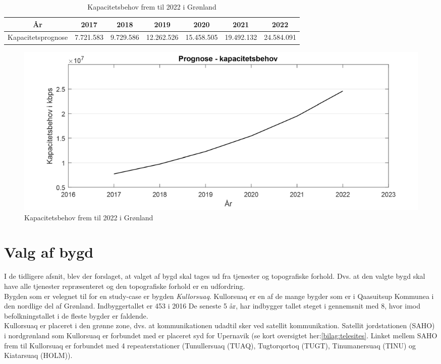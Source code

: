 \begin{table}
	\centering
    \begin{tabular}{|c|c|c|c|c|c|c|}
    \hline
    År                 & 2017      & 2018      & 2019       & 2020       & 2021       & 2022       \\ \hline
    Kapacitetsprognose & 7.721.583 & 9.729.586 & 12.262.526 & 15.458.505 & 19.492.132 & 24.584.091 \\ \hline
    \end{tabular}
    \caption{Kapacitetsbehov frem til 2022 i Grønland}
    \label{tab:kapacitetPrognose}
\end{table}
\begin{figure}
	\centering
	\includegraphics[width=1\textwidth]{figure/kapacitetsbehov.pdf}
	\caption{Kapacitetsbehov frem til 2022 i Grønland}
	\label{fig:kapacitetsbehov}
\end{figure}

\section{Valg af bygd}
I de tidligere afsnit, blev der forslaget, at valget af bygd skal tages ud fra tjenester og topografiske forhold. Dvs. at den valgte bygd skal have alle tjenester repræsenteret og den topografiske forhold er en udfordring.\\
Bygden som er velegnet til for en study-case er bygden \textit{Kullorsuaq}. Kullorsuaq er en af de mange bygder som er i Qaasuitsup Kommunea i den nordlige del af Grønland. Indbyggertallet er 453 i 2016\cite{grlStatBefolkning} De seneste 5 år, har indbygger tallet steget i gennemsnit med 8, hvor imod befolkningstallet i de fleste bygder er faldende.\\
Kullorsuaq er placeret i den grønne zone, dvs. at kommunikationen udadtil sker ved satellit kommunikation. Satellit jordstationen (SAHO) i nordgrønland som Kullorsuaq er forbundet med er placeret syd for Upernavik (se kort oversigtet her:\ref{bilag:telesites}. Linket mellem SAHO frem til Kullorsuaq er forbundet med 4 repeaterstationer (Tunullersuaq (TUAQ), Tugtorqortoq (TUGT), Tinumanersuaq (TINU) og Kiatarsuaq (HOLM)).\\

